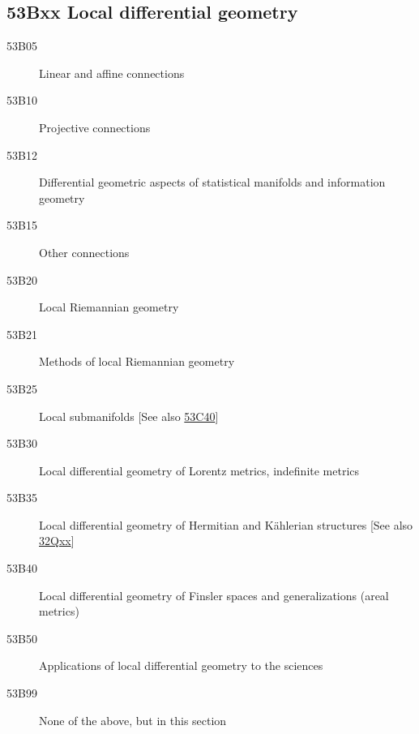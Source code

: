 \subsection*{53Bxx  Local differential geometry }\label{53Bxx}
\begin{description}  
\item [53B05]\label{53B05} Linear and affine connections
\item [53B10]\label{53B10} Projective connections
\item [53B12]\label{53B12} Differential geometric aspects of statistical manifolds and information geometry
\item [53B15]\label{53B15} Other connections
\item [53B20]\label{53B20} Local Riemannian geometry
\item [53B21]\label{53B21} Methods of local Riemannian geometry
\item [53B25]\label{53B25} Local submanifolds [See also \hyperref[53C40]{53C40}]
\item [53B30]\label{53B30} Local differential geometry of Lorentz metrics, indefinite metrics
\item [53B35]\label{53B35} Local differential geometry of  Hermitian and K\"{a}hlerian structures [See also \hyperref[32Qxx]{32Qxx}]
\item [53B40]\label{53B40} Local differential geometry of  Finsler spaces and generalizations (areal metrics)
\item [53B50]\label{53B50} Applications of local differential geometry to the sciences
\item [53B99]\label{53B99} None of the above, but in this section
\end{description}

